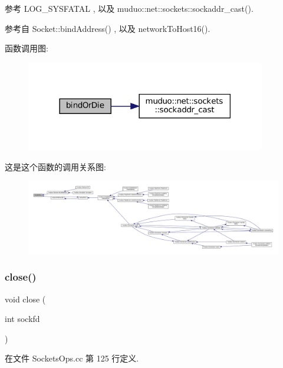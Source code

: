 参考 L\+O\+G\+\_\+\+S\+Y\+S\+F\+A\+T\+AL , 以及 muduo\+::net\+::sockets\+::sockaddr\+\_\+cast().



参考自 Socket\+::bind\+Address() , 以及 network\+To\+Host16().

函数调用图\+:
\nopagebreak
\begin{figure}[H]
\begin{center}
\leavevmode
\includegraphics[width=297pt]{namespacemuduo_1_1sockets_a8fe4065cd24e49e158dd1c16cd693ae1_cgraph}
\end{center}
\end{figure}
这是这个函数的调用关系图\+:
\nopagebreak
\begin{figure}[H]
\begin{center}
\leavevmode
\includegraphics[width=350pt]{namespacemuduo_1_1sockets_a8fe4065cd24e49e158dd1c16cd693ae1_icgraph}
\end{center}
\end{figure}
\mbox{\label{namespacemuduo_1_1sockets_acb275b6d8b5979229bae664cb7ee14da}} 
\subsubsection{\texorpdfstring{close()}{close()}}
{\footnotesize\ttfamily void close (\begin{DoxyParamCaption}\item[{int}]{sockfd }\end{DoxyParamCaption})}



在文件 Sockets\+Ops.\+cc 第 125 行定义.



